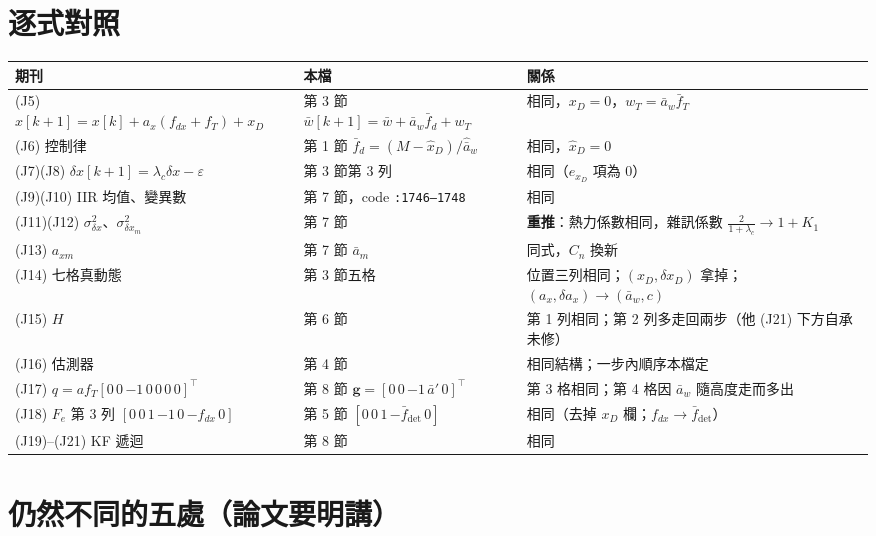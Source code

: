 \documentclass[11pt,a4paper]{ctexart}
\newcommand{\ba}{\bar{a}}
\newcommand{\bw}{\bar{w}}
\newcommand{\ap}{\ba'}
\newcommand{\ah}{\hat{\ba}_w}
\newcommand{\lc}{\lambda_c}
\newcommand{\fd}{\bar{f}_d}
\newcommand{\fdet}{\bar{f}_{\det}}
\begin{document}
\section{逐式對照}

{\small
\begin{tabular}{@{}p{5.6cm}p{4.6cm}p{6.6cm}@{}}
\toprule
期刊 & 本檔 & 關係 \\
\midrule
(J5) $x[k+1] = x[k] + a_x(f_{dx} + f_T) + x_D$ & 第 3 節 $\bw[k+1] = \bw + \ba_w\fd + w_T$ & 相同，$x_D = 0$，$w_T = \ba_w\bar f_T$ \\
(J6) 控制律 & 第 1 節 $\fd = (M - \hat x_D)/\ah$ & 相同，$\hat x_D = 0$ \\
(J7)(J8) $\delta x[k+1] = \lc\delta x - \varepsilon$ & 第 3 節第 3 列 & 相同（$e_{x_D}$ 項為 0） \\
(J9)(J10) IIR 均值、變異數 & 第 7 節，code \texttt{:1746--1748} & 相同 \\
(J11)(J12) $\sigma^2_{\delta x}$、$\sigma^2_{\delta x_m}$ & 第 7 節 & \textbf{重推}：熱力係數相同，雜訊係數 $\tfrac{2}{1+\lc} \to 1 + K_1$ \\
(J13) $a_{xm}$ & 第 7 節 $\ba_m$ & 同式，$C_n$ 換新 \\
(J14) 七格真動態 & 第 3 節五格 & 位置三列相同；$(x_D,\delta x_D)$ 拿掉；$(a_x,\delta a_x) \to (\ba_w, c)$ \\
(J15) $H$ & 第 6 節 & 第 1 列相同；第 2 列多走回兩步（他 (J21) 下方自承未修） \\
(J16) 估測器 & 第 4 節 & 相同結構；一步內順序本檔定 \\
(J17) $q = a f_T[0\,0\,{-1}\,0\,0\,0\,0]^{\top}$ & 第 8 節 $\mathbf g = [0\,0\,{-1}\,\ap\,0]^{\top}$ & 第 3 格相同；第 4 格因 $\ba_w$ 隨高度走而多出 \\
(J18) $F_e$ 第 3 列 $[0\,0\,1\,{-1}\,0\,{-f_{dx}}\,0]$ & 第 5 節 $[0\,0\,1\,{-\fdet}\,0]$ & 相同（去掉 $x_D$ 欄；$f_{dx} \to \fdet$） \\
(J19)--(J21) KF 遞迴 & 第 8 節 & 相同 \\
\bottomrule
\end{tabular}}

\section{仍然不同的五處（論文要明講）}
\end{document}
